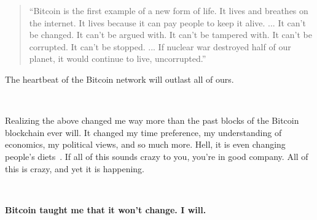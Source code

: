 \blockquote{
``Bitcoin is the first example of a new form of life. It lives and
breathes on the internet. It lives because it can pay people to keep
it alive. ... It can't be changed. It can't be argued with. It
can't be tampered with. It can't be corrupted. It can't be stopped.
... If nuclear war destroyed half of our planet, it would continue
to live, uncorrupted.'' \cite{merkle-dao}
}

The heartbeat of the Bitcoin network will outlast all of ours.

~

Realizing the above changed me way more than the past blocks of the Bitcoin
blockchain ever will. It changed my time preference, my understanding of
economics, my political views, and so much more. Hell, it is even changing
people's diets~\cite{carnivores}. If all of this sounds crazy to you, you're in
good company. All of this is crazy, and yet it is happening.

~

\textbf{Bitcoin taught me that it won't change. I will.}

%
%
%
%
%
%
%
%
%
